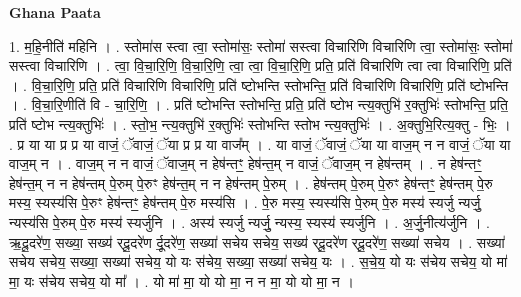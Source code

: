 \documentclass[17pt]{extarticle}
\begin{document}
\textbf{Ghana Paata } \newline

1. म॒हि॒नीति॑ महिनि । . स्तोमा॑स स्त्वा त्वा॒ स्तोमा॑सः॒ स्तोमा॑ सस्त्वा विचारिणि विचारिणि त्वा॒ स्तोमा॑सः॒ स्तोमा॑ सस्त्वा विचारिणि । . त्वा॒ वि॒चा॒रि॒णि॒ वि॒चा॒रि॒णि॒ त्वा॒ त्वा॒ वि॒चा॒रि॒णि॒ प्रति॒ प्रति॑ विचारिणि त्वा त्वा विचारिणि॒ प्रति॑ । . वि॒चा॒रि॒णि॒ प्रति॒ प्रति॑ विचारिणि विचारिणि॒ प्रति॑ ष्टोभन्ति स्तोभन्ति॒ प्रति॑ विचारिणि विचारिणि॒ प्रति॑ ष्टोभन्ति । . वि॒चा॒रि॒णीति॑ वि - चा॒रि॒णि॒ । . प्रति॑ ष्टोभन्ति स्तोभन्ति॒ प्रति॒ प्रति॑ ष्टोभ न्त्य॒क्तुभि॑ र॒क्तुभिः॑ स्तोभन्ति॒ प्रति॒ प्रति॑ ष्टोभ न्त्य॒क्तुभिः॑ । . स्तो॒भ॒ न्त्य॒क्तुभि॑ र॒क्तुभिः॑ स्तोभन्ति स्तोभ न्त्य॒क्तुभिः॑ । . अ॒क्तुभि॒रित्य॒क्तु - भिः॒ । . प्र या या प्र प्र या वाजं॒ ॅवाजं॒ ॅया प्र प्र या वाज᳚म् । . या वाजं॒ ॅवाजं॒ ॅया या वाज॒म् न न वाजं॒ ॅया या वाज॒म् न । . वाज॒म् न न वाजं॒ ॅवाज॒म् न हेष॑न्तꣳ॒॒ हेष॑न्त॒म् न वाजं॒ ॅवाज॒म् न हेष॑न्तम् । . न हेष॑न्तꣳ॒॒ हेष॑न्त॒म् न न हेष॑न्तम् पे॒रुम् पे॒रुꣳ हेष॑न्त॒म् न न हेष॑न्तम् पे॒रुम् । . हेष॑न्तम् पे॒रुम् पे॒रुꣳ हेष॑न्तꣳ॒॒ हेष॑न्तम् पे॒रु मस्य॒ स्यस्य॑सि पे॒रुꣳ हेष॑न्तꣳ॒॒ हेष॑न्तम् पे॒रु मस्य॑सि । . पे॒रु मस्य॒ स्यस्य॑सि पे॒रुम् पे॒रु मस्य॑ स्यर्जु न्यर्जु॒ न्यस्य॑सि पे॒रुम् पे॒रु मस्य॑ स्यर्जुनि । . अस्य॑ स्यर्जु न्यर्जु॒ न्यस्य॒ स्यस्य॑ स्यर्जुनि । . अ॒र्जु॒नीत्य॑र्जुनि । . ऋ॒दू॒दरे॑ण॒ सख्या॒ सख्य॑ र्‌दू॒दरे॑ण र्दू॒दरे॑ण॒ सख्या॑ सचेय सचेय॒ सख्य॑ र्‌दू॒दरे॑ण र्‌दू॒दरे॑ण॒ सख्या॑ सचेय । . सख्या॑ सचेय सचेय॒ सख्या॒ सख्या॑ सचेय॒ यो यः स॑चेय॒ सख्या॒ सख्या॑ सचेय॒ यः । . स॒चे॒य॒ यो यः स॑चेय सचेय॒ यो मा॑ मा॒ यः स॑चेय सचेय॒ यो मा᳚ । . यो मा॑ मा॒ यो यो मा॒ न न मा॒ यो यो मा॒ न । \newline
\end{document}
